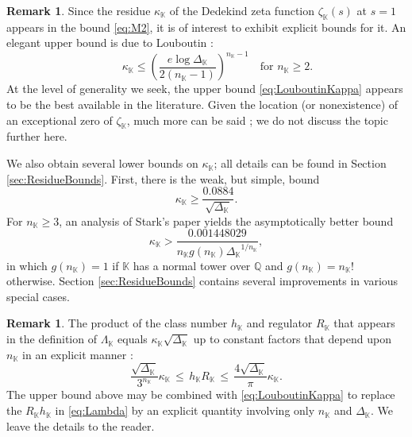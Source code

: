 \documentclass[10pt,reqno]{amsart}
\theoremstyle{plain}
\theoremstyle{definition}
\newtheorem{remark}[theorem]{Remark}
\newcommand{\Q}{\mathbb{Q}}
\newcommand{\K}{\mathbb{K}}
\begin{document}
\begin{remark}\label{Remark:Kappa}
Since the residue $\kappa_{\K}$ of the Dedekind zeta function $\zeta_{\K}(s)$ at $s=1$ appears
in the bound \eqref{eq:M2}, it is of interest to exhibit explicit bounds for it.  
An elegant upper bound is due to Louboutin \cite{Louboutin00}:
\begin{equation}\label{eq:LouboutinKappa}\qquad
    \kappa_{\K} \leq \left(\frac{e\log{\Delta_{\K}}}{2(n_{\K} - 1)}\right)^{n_{\K} - 1}
    \quad \text{for $n_{\K} \geq 2$}.
\end{equation}
At the level of generality we seek, the upper bound \eqref{eq:LouboutinKappa} appears to be the best
available in the literature.  Given the location (or nonexistence) of an exceptional zero of $\zeta_{\K}$,
much more can be said \cite{Louboutin01,Louboutin11, Louboutin03};
we do not discuss the topic further here.  

We also obtain several lower bounds on $\kappa_{\K}$;
all details can be found in Section \ref{sec:ResidueBounds}.  First, there is the weak, but simple, bound
\begin{equation*}
\kappa_{\K} \geq \frac{0.0884}{\sqrt{\Delta_{\K}}}.
\end{equation*}
For $n_{\K} \geq 3$, an analysis of Stark's paper \cite{StarkBS} yields
the asymptotically better bound 
\begin{equation*}
    \kappa_{\K} > \frac{0.001448029}{n_{\K} g(n_{\K}){\Delta_{\K}}^{1/n_{\K}}},
\end{equation*}
in which $g(n_{\K})=1$ if $\K$ has a normal tower over $\Q$ and 
$g(n_{\K}) = n_{\K}!$ otherwise.
Section \ref{sec:ResidueBounds} contains several improvements in various special cases.
\end{remark}

\begin{remark}\label{Remark:Regulator}
The product of the class number $h_{\K}$ and regulator $R_{\K}$ that appears in the definition of $\Lambda_{\K}$
equals $\kappa_{\K}\sqrt{\Delta_{\K}}$ up to constant factors that depend upon $n_{\K}$ in
an explicit manner \cite[(7), p.~42]{MR2145727}:
\begin{equation*}
\frac{ \sqrt{ \Delta_{\K}}}{3^{n_{\K}}} \kappa_{\K}
\,\leq\, h_{\K} R_{\K} 
\,\leq\, \frac{4 \sqrt{ \Delta_{\K}}}{\pi} \kappa_{\K}.
\end{equation*}
The upper bound above may be combined with \eqref{eq:LouboutinKappa} to replace
the $R_{\K} h_{\K}$ in \eqref{eq:Lambda} by an explicit quantity involving only $n_{\K}$ and $\Delta_{\K}$.  We leave the details to the reader.
\end{remark}
\end{document}
